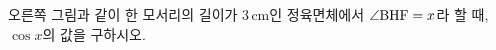 \noindent\begin{minipage}[t]{0.58\linewidth}\vspace{0pt}\raggedright 오른쪽 그림과 같이 한 모서리의 길이가 $3\,\mathrm{cm}$인 정육면체에서 $\angle\mathrm{BHF}=x$라 할 때, $\cos x$의 값을 구하시오.\end{minipage}\hfill\begin{minipage}[t]{0.4\linewidth}\vspace{0pt}\centering \resizebox{\ifdim\width>\linewidth\linewidth\else\width\fi}{!}{}\end{minipage}\par
